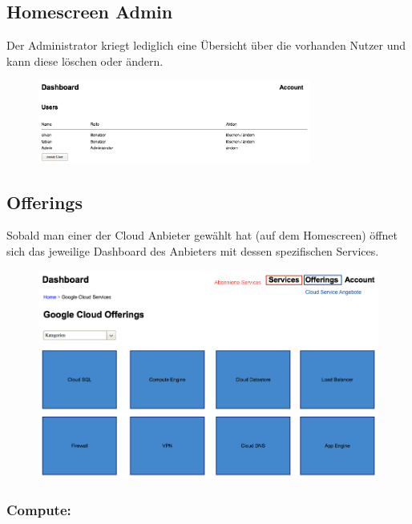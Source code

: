\documentclass[11pt]{scrartcl}
\begin{document}
\subsection{Homescreen Admin}

Der Administrator kriegt lediglich eine Übersicht über die vorhanden Nutzer und 
kann diese löschen oder ändern.
\begin{figure}[h]
  \includegraphics[width=0.8\textwidth]{homescreen_admin}
\end{figure}


\subsection{Offerings}
Sobald man einer der Cloud Anbieter gewählt hat (auf dem Homescreen) öffnet 
sich das jeweilige Dashboard des Anbieters mit dessen spezifischen Services.
\begin{figure}[h]
  \includegraphics[width=\textwidth]{homescreen_google}
\end{figure}

\newpage
\subsubsection{Compute:}
\end{document}
